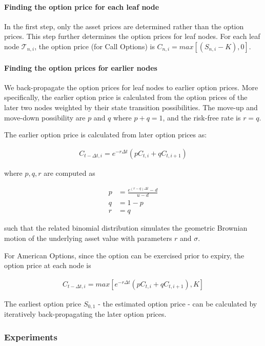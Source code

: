 \paragraph{Finding the option price for each leaf node}
In the first step, only the asset prices are determined rather than the option prices.
This step further determines the option prices for leaf nodes.
For each leaf node $\mathcal{T}_{n, i}$, the option price (for Call Options) is $C_{n, i} = max[(S_{n, i} - K), 0]$.

\paragraph{Finding the option prices for earlier nodes}
We back-propagate the option prices for leaf nodes to earlier option prices.
More specifically, the earlier option price is calculated from the option prices of the later two nodes weighted by their state transition possibilities.
The move-up and move-down possibility are $p$ and $q$ where $p + q = 1$, and the risk-free rate is $r = q$.

The earlier option price is calculated from later option prices as:

\begin{align} 
C_{t - \Delta t, i} = e^{-r \Delta t} (p C_{t, i} + q C_{t, i+1})
\end{align}

where $p, q, r$ are computed as


\begin{align} 
p &= \frac{e^{(r-q)\Delta t} - d}{u - d}\\
q &= 1 - p\\
r &= q
\end{align}

such that the related binomial distribution simulates the geometric Brownian motion of the underlying asset value with parameters $r$ and $\sigma$.

For American Options, since the option can be exercised prior to expiry, the option price at each node is

\begin{align}
C_{t - \Delta t, i} = max[e^{-r \Delta t} (p C_{t, i} + q C_{t, i+1}), K]
\end{align}

The earliest option price $S_{0, 1}$ - the estimated option price - can be calculated by iteratively back-propagating the later option prices. 

\subsubsection{Experiments}


